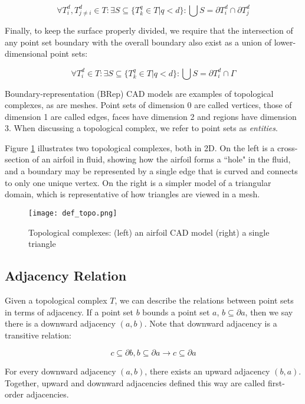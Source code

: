 \[\forall T^d_i,T^d_{j\neq i} \in T: \exists S \subseteq \{T^q_k \in T \big| q < d\}:
\bigcup S = \partial T^d_i \cap \partial T^d_j\]

Finally, to keep the surface properly divided, we require that
the intersection of any point set boundary with the overall
boundary also exist as a union of lower-dimensional point sets:

\[\forall T^d_i \in T: \exists S \subseteq \{T^q_k \in T \big| q < d\}:
\bigcup S = \partial T^d_i \cap \Gamma\]

Boundary-representation (BRep) CAD models are examples
of topological complexes, as are meshes.
Point sets of dimension 0 are called vertices, those
of dimension 1 are called edges, faces have dimension 2
and regions have dimension 3.
When discussing a topological complex, we
refer to point sets as \emph{entities}.

Figure \ref{fig:def_topo} illustrates two topological
complexes, both in 2D.
On the left is a cross-section of an airfoil in fluid,
showing how the airfoil forms a ``hole" in the fluid,
and a boundary may be represented by a single edge
that is curved and connects to only one unique vertex.
On the right is a simpler model of a triangular domain,
which is representative of how triangles are viewed
in a mesh.

\begin{figure}
\begin{center}
\texttt{[image: def\_topo.png]}
\caption{Topological complexes: (left) an airfoil CAD model (right)
a single triangle}
\label{fig:def_topo}
\end{center}
\end{figure}

\subsection{Adjacency Relation}
\label{sec:def_adj}

Given a topological complex $T$, we can describe the relations between
point sets in terms of adjacency.
If a point set $b$ bounds a point set $a$,
$b \subseteq \partial a$, then we say there is a
downward adjacency $(a,b)$.
Note that downward adjacency is a transitive relation:

\[c \subseteq \partial b, b \subseteq \partial a \to c \subseteq \partial a\]

For every downward adjacency $(a,b)$, there exists an upward
adjacency $(b,a)$.
Together, upward and downward adjacencies defined this way
are called first-order adjacencies.

